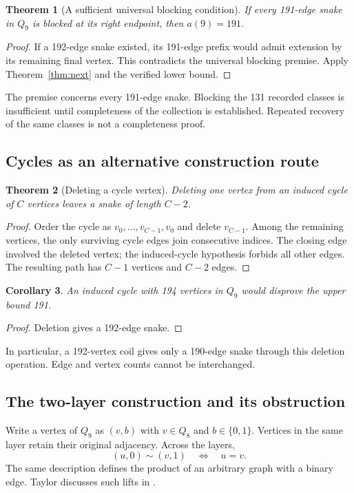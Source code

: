 \documentclass[11pt,a4paper]{article}
\newtheorem{theorem}{Theorem}[section]
\newtheorem{corollary}[theorem]{Corollary}
\theoremstyle{definition}
\theoremstyle{remark}
\newcommand{\Q}{Q}
\begin{document}
\begin{theorem}[A sufficient universal blocking condition]
If every 191-edge snake in $\Q_9$ is blocked at its right endpoint, then $a(9)=191$.
\end{theorem}
\begin{proof}
If a 192-edge snake existed, its 191-edge prefix would admit extension by its remaining final vertex. This contradicts the universal blocking premise. Apply Theorem~\ref{thm:next} and the verified lower bound.
\end{proof}
The premise concerns every 191-edge snake. Blocking the 131 recorded classes is insufficient until completeness of the collection is established. Repeated recovery of the same classes is not a completeness proof.

\subsection{Cycles as an alternative construction route}
\begin{theorem}[Deleting a cycle vertex]
Deleting one vertex from an induced cycle of $C$ vertices leaves a snake of length $C-2$.
\end{theorem}
\begin{proof}
Order the cycle as $v_0,\ldots,v_{C-1},v_0$ and delete $v_{C-1}$. Among the remaining vertices, the only surviving cycle edges join consecutive indices. The closing edge involved the deleted vertex; the induced-cycle hypothesis forbids all other edges. The resulting path has $C-1$ vertices and $C-2$ edges.
\end{proof}
\begin{corollary}
An induced cycle with 194 vertices in $\Q_9$ would disprove the upper bound 191.
\end{corollary}
\begin{proof}
Deletion gives a 192-edge snake.
\end{proof}
In particular, a 192-vertex coil gives only a 190-edge snake through this deletion operation. Edge and vertex counts cannot be interchanged.

\subsection{The two-layer construction and its obstruction}
Write a vertex of $\Q_9$ as $(v,b)$ with $v\in\Q_8$ and $b\in\{0,1\}$. Vertices in the same layer retain their original adjacency. Across the layers,
\[
(u,0)\sim(v,1)\quad\Longleftrightarrow\quad u=v.
\]
The same description defines the product of an arbitrary graph with a binary edge. Taylor discusses such lifts in \cite{taylor}.
\end{document}

